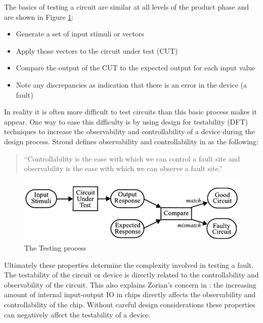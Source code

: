 \documentclass[12pt]{report}
\begin{document}
The basics of testing a circuit are similar at all levels of the product phase and are shown in Figure \ref{fig:process}:
\begin{itemize}
\item Generate a set of input stimuli or vectors
\item Apply those vectors to the circuit under test (CUT)
\item Compare the output of the CUT to the expected output for each input value
\item Note any discrepancies as indication that there is an error in the device (a fault)
\end{itemize}
In reality it is often more difficult to test circuits than this basic process makes it appear.  One way to ease this difficulty is by using design for testability (DFT) techniques to increase the observability and controllability of a device during the design process\cite{stroud}.  Stroud defines observability and controllability in \cite{stroud} as the following:
\begin{quote}
``Controllability is the ease with which we can control a fault site and observability is the ease with which we can observe a fault site.\cite{stroud}''
\end{quote}
\begin{figure}
	\begin{center}
		\includegraphics[scale=1]{images/testing-process}
	\end{center}
	\caption{The Testing process\cite{stroud}}
	\label{fig:process}
\end{figure}
Ultimately these properties determine the complexity involved in testing a fault.  The testability of the circuit or device is directly related to the controllability and observability of the circuit\cite{stroud}.  This also explains Zorian's concern in \cite{zorian}: the increasing amount of internal input-output IO in chips directly affects the observability and controllability of the chip.  Without careful design considerations these properties can negatively affect the testability of a device\cite{stroud}.
\end{document}
